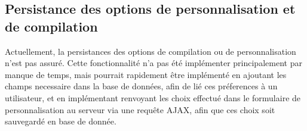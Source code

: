 \subsection{Persistance des options de personnalisation et de compilation}

Actuellement, la persistances des options de compilation ou de personnalisation n'est pas assuré. Cette fonctionnalité n'a pas été implémenter principalement par manque de temps, mais pourrait rapidement être implémenté en ajoutant les champs necessaire dans la base de données, afin de lié ces préferences à un utilisateur, et en implémentant renvoyant les choix effectué dans le formulaire de personnalisation au serveur via une requête AJAX, afin que ces choix soit sauvegardé en base de donnée.
